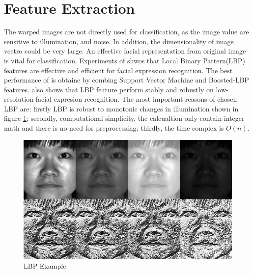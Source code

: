 \section{Feature Extraction}
The warped images are not directly used for classification, as the image value are sensitive to illumination, and noise. In addition, the dimensionality of image vectro could be very large. An effective facial representation from original image is vital for classification. Experiments of \cite{shan2009facial} shwos that Local Binary Pattern(LBP) features are effective and efficient for facial expression recognition. The best performance of \cite{shan2009facial} is obtaine by combing Support Vector Machine and Boosted-LBP features. \cite{shan2009facial} also shows that LBP feature perform stably and robustly on low-resolution facial expresion recognition. The most important reasons of chosen LBP are: firstly LBP is robust to monotonic changes in illumination shown in figure \ref{fig:LBPE00}; secondly, computational simplicity, the calcualtion only contain integer math and there is no need for preprocessing; thirdly, the time complex is $O(n)$.
\begin{figure}[ht]
\centering
\includegraphics[width = .5\textwidth]{imgs/lbp_yale.jpg}
\caption[The LOF caption]{LBP Example\footnotemark}
\label{fig:LBPE00}
\end{figure}
